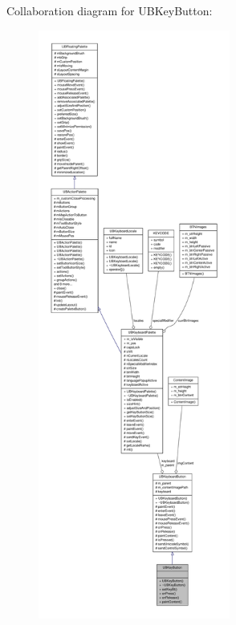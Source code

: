 Collaboration diagram for U\-B\-Key\-Button\-:
\nopagebreak
\begin{figure}[H]
\begin{center}
\leavevmode
\includegraphics[height=550pt]{d1/d46/class_u_b_key_button__coll__graph}
\end{center}
\end{figure}

